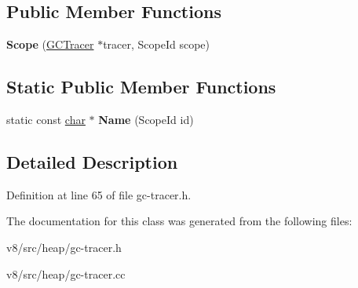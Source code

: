 \subsection*{Public Member Functions}
\begin{DoxyCompactItemize}
\item 
\mbox{\label{classv8_1_1internal_1_1GCTracer_1_1Scope_a8ef5876b55fd9d305d2b9df8c1d6dcf3}} 
{\bfseries Scope} (\mbox{\hyperlink{classv8_1_1internal_1_1GCTracer}{G\+C\+Tracer}} $\ast$tracer, Scope\+Id scope)
\end{DoxyCompactItemize}
\subsection*{Static Public Member Functions}
\begin{DoxyCompactItemize}
\item 
\mbox{\label{classv8_1_1internal_1_1GCTracer_1_1Scope_a9b8c6d78e8e1c0a676dfda714819ddf8}} 
static const \mbox{\hyperlink{classchar}{char}} $\ast$ {\bfseries Name} (Scope\+Id id)
\end{DoxyCompactItemize}


\subsection{Detailed Description}


Definition at line 65 of file gc-\/tracer.\+h.



The documentation for this class was generated from the following files\+:\begin{DoxyCompactItemize}
\item 
v8/src/heap/gc-\/tracer.\+h\item 
v8/src/heap/gc-\/tracer.\+cc\end{DoxyCompactItemize}
